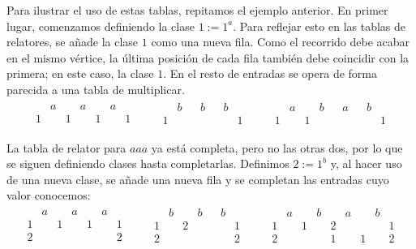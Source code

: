 Para ilustrar el uso de estas tablas, repitamos el ejemplo anterior. En primer lugar, comenzamos definiendo la clase $1:=1^a$. Para reflejar esto en las tablas de relatores, se añade la clase $1$ como una nueva fila. Como el recorrido debe acabar en el mismo vértice, la última posición de cada fila también debe coincidir con la primera; en este caso, la clase $1$. En el resto de entradas se opera de forma parecida a una tabla de multiplicar.
\begin{align*}
\begin{array}{ccccccc}
& a && a && a \\
\hline
1 && 1 && 1 && 1
\end{array}
\qquad
\begin{array}{ccccccc}
& b && b && b \\
\hline
1&&  &&  && 1
\end{array}
\qquad
\begin{array}{ccccccccc}
& a && b && a && b\\
\hline
1 && 1 &&   &&  && 1
\end{array}
\end{align*}

La tabla de relator para $aaa$ ya está completa, pero no las otras dos, por lo que se siguen definiendo clases hasta completarlas.
Definimos $2:=1^b$ y, al hacer uso de una nueva clase, se añade una nueva fila y se completan las entradas cuyo valor conocemos:
\begin{align*}
\begin{array}{ccccccc}
& a && a && a \\
\hline
1 && 1 && 1 && 1 \\
2 &&   &&   && 2
\end{array}
\qquad
\begin{array}{ccccccc}
& b && b && b \\
\hline
1&& 2 &&  && 1 \\
2&&  &&  && 2
\end{array}
\qquad
\begin{array}{ccccccccc}
& a && b && a && b\\
\hline
1 && 1 && 2  &&  && 1 \\
2 &&  && 1  && 1 && 2
\end{array}
\end{align*}


